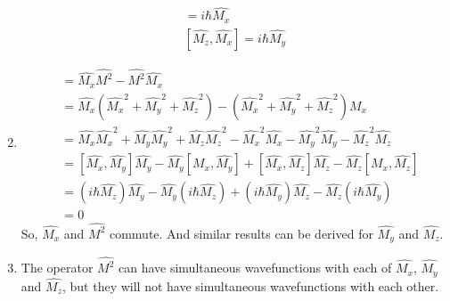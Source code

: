 \begin{solution}
\begin{enumerate}
\begin{align*}
                  [\hat{M_y},\hat{M_z}]=i \hbar \hat{M_x} \\
                  [\hat{M_z},\hat{M_x}]=i \hbar \hat{M_y}
              \end{align*}
        \item \begin{align*}
                  [\hat{M_x},\hat{M^2}] & =\hat{M_x}\hat{M^2}-\hat{M^2}\hat{M_x}                                                                       \\
                                        & =\hat{M_x}(\hat{M_x}^2+\hat{M_y}^2+\hat{M_z}^2)-(\hat{M_x}^2+\hat{M_y}^2+\hat{M_z}^2)\hat{M_x}               \\
                                        & =\hat{M_x}\hat{M_x}^2+\hat{M_y}\hat{M_y}^2+\hat{M_z}\hat{M_z}^2-\hat{M_x}^2\hat{M_x}
                  -\hat{M_y}^2\hat{M_y}-\hat{M_z}^2\hat{M_z}                                                                                           \\
                                        & =[\hat{M_x},\hat{M_y}]\hat{M_y}-\hat{M_y}[\hat{M_x},\hat{M_y}]+[\hat{M_x},\hat{M_z}]\hat{M_z}
                  -\hat{M_z}[\hat{M_x},\hat{M_z}]                                                                                                      \\
                                        & =(i\hbar\hat{M_z})\hat{M_y}-\hat{M_y}(i\hbar\hat{M_z})+(i\hbar\hat{M_y})\hat{M_z}-\hat{M_z}(i\hbar\hat{M_y}) \\
                                        & =0
              \end{align*}
              So, $\hat{M_x}$ and $\hat{M^2}$ commute. And similar results can be derived for $\hat{M_y}$ and $\hat{M_z}$.
        \item The operator $\hat{M^2}$ can have simultaneous wavefunctions with each of $\hat{M_x}$, $\hat{M_y}$ and $\hat{M_z}$,
              but they will not have simultaneous wavefunctions with each other.
    \end{enumerate}
\end{solution}